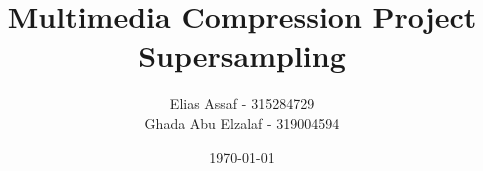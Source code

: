 \documentclass{article}
\title{Multimedia Compression Project\\Supersampling}
\author{Elias Assaf - 315284729\\
Ghada Abu Elzalaf - 319004594}
\date{\today}
\begin{document}
\maketitle
\tableofcontents
\newpage
 
\section{}
\subsection{}
\subsection{}

\section{}

 
\end{document}

